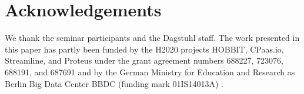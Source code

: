 \section*{Acknowledgements}
We thank the seminar participants and the Dagstuhl staff.
The work presented in this paper has partly been funded by the H2020 projects HOBBIT, CPaas.io, Streamline, and Proteus under the grant agreement numbers 688227, 723076, 688191, and 687691 and by the German Ministry for Education and Research as Berlin Big Data Center BBDC (funding mark 01IS14013A) .
